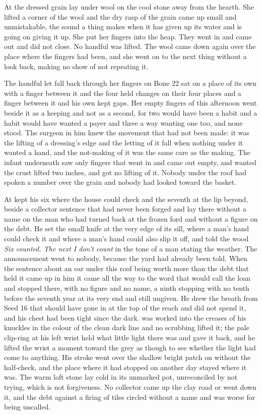 \scenebreak

At  the dressed grain lay under wool on the cool stone away from the hearth. She lifted a corner of the wool and the dry rasp of the grain came up small and unmistakable, the sound a thing makes when it has given up its water and is going on giving it up. She put her fingers into the heap. They went in and came out and did not close. No handful was lifted. The wool came down again over the place where the fingers had been, and she went on to the next thing without a look back, making no show of not repeating it.

The handful let fall back through her fingers on Bone 22 sat on a place of its own with a finger between it and the four held changes on their four places and a finger between it and his own kept gaps. Her empty fingers of this afternoon went beside it as a keeping and not as a second, for two would have been a habit and a habit would have wanted a payer and three a way wanting one too, and none stood. The surgeon in him knew the movement that had not been made: it was the lifting of a dressing's edge and the letting of it fall when nothing under it wanted a hand, and the not-making of it was the same care as the making. The infant underneath saw only fingers that went in and came out empty, and wanted the crust lifted two inches, and got no lifting of it. Nobody under the roof had spoken a number over the grain and nobody had looked toward the basket.

At   kept his six where the house could check and the seventh at the lip beyond, beside a collector sentence that had never been forged and lay there without a name on the man who had turned back at the frozen ford and without a figure on the debt. He set the small knife at the very edge of its sill, where a man's hand could check it and where a man's hand could also slip it off, and told the wood \emph{Six counted. The next I don't count} in the tone of a man stating the weather. The announcement went to nobody, because the yard had already been told. When the sentence about an ear under this roof being worth more than the debt that held it came up in him it came all the way to the word that would call the loan and stopped there, with no figure and no name, a ninth stopping with no tenth before the seventh year at its very end and still ungiven. He drew the breath from Seed 16 that should have gone in at the top of the reach and did not spend it, and his chest had been tight since the dark.  was worked into the creases of his knuckles in the colour of the clean dark line and no scrubbing lifted it; the pale clip-ring at his left wrist held what little light there was and gave it back, and he lifted the wrist a moment toward the grey as though to see whether the light had come to anything. His stroke went over the shallow bright patch on  without the half-check, and the place where it had stopped on another day stayed where it was. The warm loft stone lay cold in its unmarked pot, unreconciled by not trying, which is not forgiveness. No collector came up the clay road or went down it, and the debt against a firing of tiles circled without a name and was worse for being uncalled.

